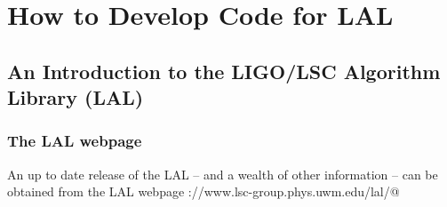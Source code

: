 \documentclass[oneside]{book}
\begin{document}
\part{How to Develop Code for LAL}

\chapter{An Introduction to the LIGO/LSC Algorithm Library (LAL)}

\section{The LAL webpage}

An up to date release  of the LAL -- and a wealth of other information
-- can be obtained from the LAL webpage
\verb@http://www.lsc-group.phys.uwm.edu/lal/@
\end{document}
